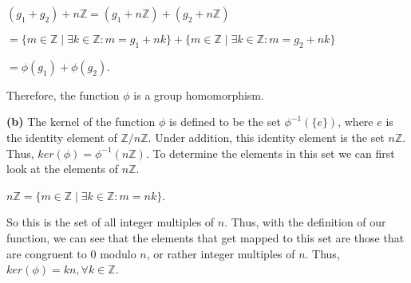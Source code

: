 \documentclass[12pt, a4paper]{article}
\begin{document}
\begin{flushleft}
\centerline{$(g_1+g_2)+n\mathbb{Z}=(g_1+n\mathbb{Z})+(g_2+n\mathbb{Z})$}\hfil
\vspace{2mm}
\centerline{$=\{m\in\mathbb{Z}\mid\exists k\in\mathbb{Z}\colon m=g_1+nk\}+\{m\in\mathbb{Z}\mid\exists k\in\mathbb{Z}\colon m=g_2+nk\}$}\hfil
\vspace{8mm}
\centerline{$=\phi(g_1)+\phi(g_2)$.}\hfil
\vspace{8mm}

\begin{flushleft}
Therefore, the function $\phi$ is a group homomorphism.
\end{flushleft}

\vspace{6mm}
\hspace{2mm}\textbf{(b)} The kernel of the function $\phi$ is defined to be the set $\phi^{-1}(\{e\})$, where $e$ is the identity element of $\mathbb{Z}/n\mathbb{Z}$. Under addition, this identity element is the set $n\mathbb{Z}$. Thus, $ker(\phi)=\phi^{-1}(n\mathbb{Z})$. To determine the elements in this set we can first look at the elements of $n\mathbb{Z}$.
\vspace{6mm}

\centerline{$n\mathbb{Z}=\{m\in\mathbb{Z}\mid\exists k\in\mathbb{Z}\colon m=nk\}$.}
\vspace{6mm}

\begin{flushleft}
So this is the set of all integer multiples of $n$. Thus, with the definition of our function, we can see that the elements that get mapped to this set are those that are congruent to $0$ modulo $n$, or rather integer multiples of $n$. Thus, $ker(\phi)=kn, \forall k\in\mathbb{Z}$.
\end{flushleft}




\end{flushleft}
\end{document}
